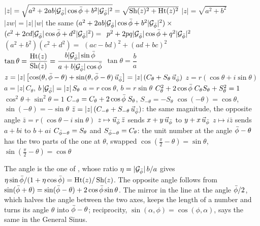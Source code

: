 \begin{gnlaws}
  {$|z| = \sqrt{a^2 + 2ab|\mathcal{G}_{\bar{\phi}}|\cos\bar{\phi} + b^2|\mathcal{G}_{\bar{\phi}}|^2} = \sqrt{\operatorname{Sh}(z)^2 + \operatorname{Ht}(z)^2}$}
  {$|z| = \sqrt{a^2 + b^2}$}
  {$|zw| = |z|\,|w|$}
  {the same}
  {$(a^2 + 2ab|\mathcal{G}_{\bar{\phi}}|\cos\bar{\phi} + b^2|\mathcal{G}_{\bar{\phi}}|^2) \times {}$ \newline $(c^2 + 2cd|\mathcal{G}_{\bar{\phi}}|\cos\bar{\phi} + d^2|\mathcal{G}_{\bar{\phi}}|^2) = {}$ \newline $p^2 + 2pq|\mathcal{G}_{\bar{\phi}}|\cos\bar{\phi} + q^2|\mathcal{G}_{\bar{\phi}}|^2$}
  {$(a^2 + b^2)(c^2 + d^2) = {}$ \newline $(ac - bd)^2 + (ad + bc)^2$}
  {$\tan\theta = \dfrac{\operatorname{Ht}(z)}{\operatorname{Sh}(z)} = \dfrac{b|\mathcal{G}_{\bar{\phi}}|\sin\bar{\phi}}{a + b|\mathcal{G}_{\bar{\phi}}|\cos\bar{\phi}}$}
  {$\tan\theta = \dfrac{b}{a}$}
  {$z = |z|\,\bigl[\cos(\theta, \bar{\phi} - \theta) + \sin(\theta, \bar{\phi} - \theta)\,\vec{u}_{\bar{\phi}}\bigr] = |z|\,(C_\theta + S_\theta\,\vec{u}_{\bar{\phi}})$}
  {$z = r(\cos\theta + i\sin\theta)$}
  {$a = |z|\,C_\theta$, \quad $b\,|\mathcal{G}_{\bar{\phi}}| = |z|\,S_\theta$}
  {$a = r\cos\theta$, \quad $b = r\sin\theta$}
  {$C_\theta^2 + 2\cos\bar{\phi}\;C_\theta S_\theta + S_\theta^2 = 1$}
  {$\cos^2\theta + \sin^2\theta = 1$}
  {$C_{-\theta} = C_\theta + 2\cos\bar{\phi}\;S_\theta$, \quad $S_{-\theta} = -S_\theta$}
  {$\cos(-\theta) = \cos\theta$, \newline $\sin(-\theta) = -\sin\theta$}
  {$\bar{z} = |z|\,(C_{-\theta} + S_{-\theta}\,\vec{u}_{\bar{\phi}})$: the same magnitude, the opposite angle}
  {$\bar{z} = r(\cos\theta - i\sin\theta)$}
  {$z \mapsto \vec{u}_{\bar{\phi}}\,\bar{z}$ sends $x + y\,\vec{u}_{\bar{\phi}}$ to $y + x\,\vec{u}_{\bar{\phi}}$}
  {$z \mapsto i\bar{z}$ sends $a + bi$ to $b + ai$}
  {$C_{\bar{\phi} - \theta} = S_\theta$ and $S_{\bar{\phi} - \theta} = C_\theta$: the unit number at the angle $\bar{\phi} - \theta$ has the two parts of the one at $\theta$, swapped}
  {$\cos(\tfrac{\pi}{2} - \theta) = \sin\theta$, \newline $\sin(\tfrac{\pi}{2} - \theta) = \cos\theta$}
\end{gnlaws}
The angle is the one of , whose ratio $\eta = |\mathcal{G}_{\bar{\phi}}|\,b/a$ gives $\eta\sin\bar{\phi}/(1 + \eta\cos\bar{\phi}) = \operatorname{Ht}(z)/\operatorname{Sh}(z)$. The opposite angle follows from $\sin(\bar{\phi} + \theta) = \sin(\bar{\phi} - \theta) + 2\cos\bar{\phi}\sin\theta$. The mirror in the line at the angle $\bar{\phi}/2$, which halves the angle between the two axes, keeps the length of a number and turns its angle $\theta$ into $\bar{\phi} - \theta$; reciprocity, $\sin(\alpha, \phi) = \cos(\phi, \alpha)$, says the same in the General Sinus.

